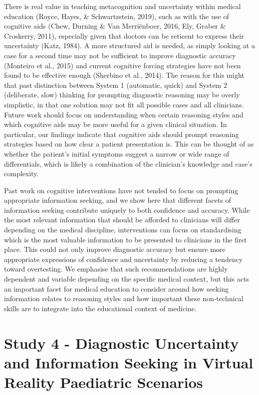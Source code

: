\documentclass[a4paper, nobind]{templates/ociamthesis}
\begin{document}
There is real value in teaching metacognition and uncertainty within medical education (Royce, Hayes, \& Schwartzstein, 2019), such as with the use of cognitive aids (Chew, Durning \& Van Merriënboer, 2016, Ely, Graber \& Croskerry, 2011), especially given that doctors can be reticent to express their uncertainty (Katz, 1984). A more structured aid is needed, as simply looking at a case for a second time may not be sufficient to improve diagnostic accuracy (Monteiro et al., 2015) and current cognitive forcing strategies have not been found to be effective enough (Sherbino et al., 2014). The reason for this might that past distinction between System 1 (automatic, quick) and System 2 (deliberate, slow) thinking for prompting diagnostic reasoning may be overly simplistic, in that one solution may not fit all possible cases and all clinicians. Future work should focus on understanding when certain reasoning styles and which cognitive aids may be more useful for a given clinical situation. In particular, our findings indicate that cognitive aids should prompt reasoning strategies based on how clear a patient presentation is. This can be thought of as whether the patient's initial symptoms suggest a narrow or wide range of differentials, which is likely a combination of the clinician's knowledge and case's complexity.

Past work on cognitive interventions have not tended to focus on prompting appropriate information seeking, and we show here that different facets of information seeking contribute uniquely to both confidence and accuracy. While the most relevant information that should be afforded to clinicians will differ depending on the medical discipline, interventions can focus on standardising which is the most valuable information to be presented to clinicians in the first place. This could not only improve diagnostic accuracy but ensure more appropriate expressions of confidence and uncertainty by reducing a tendency toward overtesting. We emphasise that such recommendations are highly dependent and variable depending on the specific medical context, but this acts an important facet for medical education to consider around how seeking information relates to reasoning styles and how important these non-technical skills are to integrate into the educational context of medicine.

\chapter*{Study 4 - Diagnostic Uncertainty and Information Seeking in Virtual Reality Paediatric Scenarios}\label{study-4---diagnostic-uncertainty-and-information-seeking-in-virtual-reality-paediatric-scenarios}
\end{document}
